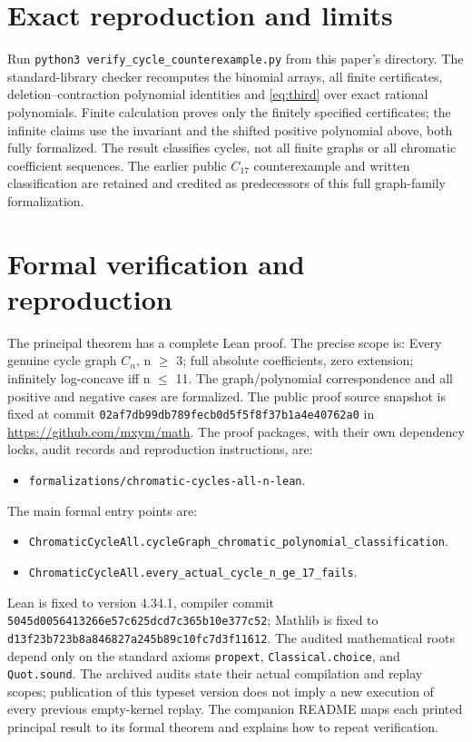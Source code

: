 \documentclass[11pt]{article}
\begin{document}
\section{Exact reproduction and limits}
Run \texttt{python3 verify\_cycle\_counterexample.py} from this paper's
directory. The standard-library checker recomputes the binomial arrays,
all finite certificates, deletion--contraction polynomial identities and
\eqref{eq:third} over exact rational polynomials. Finite calculation proves
only the finitely specified certificates; the infinite claims use the
invariant and the shifted positive polynomial above, both fully formalized.
The result classifies cycles, not all finite graphs or all chromatic
coefficient sequences. The earlier public $C_{17}$ counterexample and
written classification are retained and credited as predecessors of this
full graph-family formalization.

\section{Formal verification and reproduction}
The principal theorem has a complete Lean proof. The precise scope is:
Every genuine cycle graph $C_n$, n $\ge$ 3; full absolute coefficients, zero extension; infinitely log-concave iff n $\le$ 11. The graph/polynomial correspondence and all positive and negative cases are formalized.
The public proof source snapshot is fixed at commit
\nolinkurl{02af7db99db789fecb0d5f5f8f37b1a4e40762a0} in \url{https://github.com/mxym/math}.
The proof packages, with their own dependency locks, audit records and
reproduction instructions, are:
\begin{itemize}
\item \nolinkurl{formalizations/chromatic-cycles-all-n-lean}.
\end{itemize}
The main formal entry points are:
\begin{itemize}
\item \nolinkurl{ChromaticCycleAll.cycleGraph_chromatic_polynomial_classification}.
\item \nolinkurl{ChromaticCycleAll.every_actual_cycle_n_ge_17_fails}.
\end{itemize}
Lean is fixed to version 4.34.1, compiler commit
\nolinkurl{5045d0056413266e57c625dcd7c365b10e377c52}; Mathlib is fixed to
\nolinkurl{d13f23b723b8a846827a245b89c10fc7d3f11612}.
The audited mathematical roots depend only on the standard axioms
\texttt{propext}, \texttt{Classical.choice}, and \texttt{Quot.sound}.
The archived audits state their actual compilation and replay scopes;
publication of this typeset version does not imply a new execution of every
previous empty-kernel replay. The companion README maps each printed
principal result to its formal theorem and explains how to repeat verification.
\end{document}
